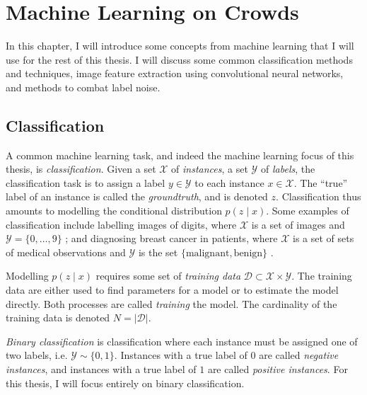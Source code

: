\chapter{Machine Learning on Crowds}
\label{cha:ml}

 In this chapter, I will introduce some
concepts from machine learning that I will use for the rest of this thesis. I
will discuss some common classification methods and techniques, image feature
extraction using convolutional neural networks, and methods to combat label noise.

\section{Classification}
\label{sec:classification}
    
    A common machine learning task, and indeed the machine learning focus of
    this thesis, is \emph{classification}. Given a set $\mathcal X$ of
    \emph{instances}, a set $\mathcal Y$ of \emph{labels}, the classification
    task is to assign a label $y \in \mathcal Y$ to each instance $x \in
    \mathcal X$. The ``true'' label of an instance is called the
    \emph{groundtruth}, and is denoted $z$. Classification thus amounts to
    modelling the conditional distribution $p(z \mid x)$. Some examples of
    classification include labelling images of digits, where $\mathcal X$ is a
    set of images and $\mathcal Y = \{0, \dots, 9\}$ \citep{lecun98}; and
    diagnosing breast cancer in patients, where $\mathcal X$ is a set of sets of
    medical observations and $\mathcal Y$ is the set $\{\text{malignant},
    \text{benign}\}$ \citep{wolberg90}.

    Modelling $p(z \mid x)$ requires some set of \emph{training data} $\mathcal
    D \subset \mathcal X \times \mathcal Y$. The training data are either used
    to find parameters for a model or to estimate the model directly. Both
    processes are called \emph{training} the model. The cardinality of the
    training data is denoted $N = |\mathcal D|$.

    \emph{Binary classification} is classification where each instance must be
    assigned one of two labels, i.e. $\mathcal Y \sim \{0, 1\}$. Instances with
    a true label of $0$ are called \emph{negative instances}, and instances with
    a true label of $1$ are called \emph{positive instances}. For this thesis, I
    will focus entirely on binary classification.

